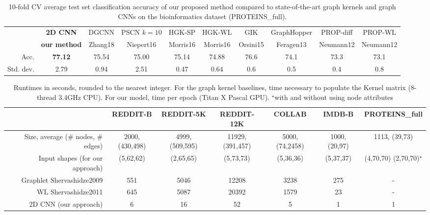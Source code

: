 \documentclass[sigconf]{acmart}
\begin{document}
\begin{table*}[!h]
\begin{center}
\begin{tabular}{ |r|ccccccccc| } 
 \hline
 & \textbf{2D CNN} & DGCNN & PSCN $k=10$ & HGK-SP & HGK-WL & GIK & GraphHopper & PROP-diff & PROP-WL \\
 & \textbf{our method} & Zhang18 & Niepert16 & Morris16 & Morris16  & Orsini15 & Feragen13 & Neumann12 & Neumann12 \\
 \hline
 Acc. & \textbf{77.12} & 75.54 & 75.00 & 75.14 & 74.88 & 76.6 & 74.1 & 73.3 & 73.1  \\ 
Std. dev. & 2.79 & 0.94 & 2.51 & 0.47 &  0.64 & 0.6 & 0.5 & 0.4 & 0.8 \\ 
 \hline
\end{tabular}
\end{center}
\captionsetup{justification=centering, size=small}
\caption{10-fold CV average test set classification accuracy of our proposed method compared to state-of-the-art graph kernels and graph CNNs on the bioinformatics dataset (PROTEINS\_full).}
\label{tab:results_bio}
\end{table*}


\begin{table*}[!h]
\begin{center}
\begin{tabular}{ |r|ccccc|c| } 
 \hline
 & REDDIT-B & REDDIT-5K & REDDIT-12K & COLLAB & IMDB-B & PROTEINS\_full \\
 \hline
 \scriptsize{Size, average (\# nodes, \# edges)} & \scriptsize{2000, (430,498)} & \scriptsize{4999, (509,595)} & \scriptsize{11929, (391,457)} & \scriptsize{5000, (74,2458)} & \scriptsize{1000, (20,97)} & 
 \scriptsize{1113, (39,73)} \\
 \scriptsize{Input shapes (for our approach)} & \scriptsize{(5,62,62)} & \scriptsize{(2,65,65)} & \scriptsize{(5,73,73)} & \scriptsize{(5,36,36)} & \scriptsize{(5,37,37)} & \scriptsize{(4,70,70)} \scriptsize{(2,70,70)}$^\star$ \\
 \hline  \hline
 Graphlet \scriptsize{Shervashidze2009} & 551 & 5046 & 12208 & 3238 & 275 & -  \\
 WL \scriptsize{Shervashidze2011} & 645 & 5087 & 20392 & 1579 & 23 & -  \\ \hline \hline
 2D CNN \scriptsize{(our approach)} & 6 & 16 & 52 & 5 & 1 & 1\\
 \hline
\end{tabular}
\end{center}
\captionsetup{justification=centering, size=small}
\caption{Runtimes in seconds, rounded to the nearest integer. For the graph kernel baselines, time necessary to populate the Kernel matrix (8-thread 3.4GHz CPU). For our model, time per epoch (Titan X Pascal GPU). $^\star$with and without using node attributes}
\label{table:time}
\end{table*}
\end{document}

